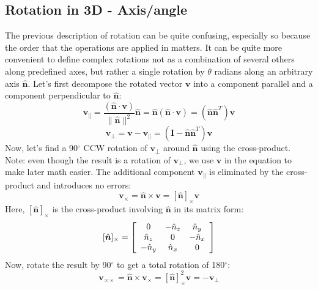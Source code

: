 \documentclass{article}
\begin{document}
\subsection{Rotation in 3D - Axis/angle}
The previous description of rotation can be quite confusing, especially so because the order that the operations are applied in matters. It can be quite more convenient to define complex rotations not as a combination of several others along predefined axes, but rather a single rotation by $\theta$ radians along an arbitrary axis $\mathbf{\hat n}$. Let's first decompose the rotated vector $\mathbf v$ into a component parallel and a component perpendicular to $\mathbf{\hat n}$:
\[
\boldsymbol { v } _ { \| } = 
\dfrac{( \hat { \boldsymbol { n } } \cdot \boldsymbol { v } )}{\| \hat { \boldsymbol { n } } \| ^ 2} \hat { \boldsymbol { n } } = 
\hat { \boldsymbol { n } } ( \hat { \boldsymbol { n } } \cdot \boldsymbol { v } ) = 
\left( \hat { \boldsymbol { n } } \hat { \boldsymbol { n } } ^ { T } \right) \boldsymbol { v }
\]
\[
\boldsymbol { v } _ { \perp } =
\boldsymbol { v } - \boldsymbol { v } _ { \| } =
\left( \boldsymbol { I } - \hat { \boldsymbol { n } } \hat { \boldsymbol { n } } ^ { T } \right) \boldsymbol { v }
\]
\noindent
Now, let's find a 90$^\circ$ CCW rotation of $\mathbf{v_\perp}$ around $\mathbf{\hat n}$ using the cross-product. Note: even though the result is a rotation of $\mathbf{v_\perp}$, we use $\mathbf v$ in the equation to make later math easier. The additional component $\mathbf{v_\|}$ is eliminated by the cross-product and introduces no errors: 
\[
\boldsymbol { v } _ { \times } = \hat { \boldsymbol { n } } \times \boldsymbol { v } = [ \hat { \boldsymbol { n } } ]_{\times} \boldsymbol { v }
\]
\noindent
Here, $[ \hat { \boldsymbol { n } } ]_{\times}$ is the cross-product involving $\hat { \boldsymbol { n } }$ in its matrix form:
\[
[ \hat { \boldsymbol { n } } ] _ { \times } = \left[ \begin{array} { c c c } { 0 } & { - \hat { n } _ { z } } & { \hat { n } _ { y } } \\ { \hat { n } _ { z } } & { 0 } & { - \hat { n } _ { x } } \\ { - \hat { n } _ { y } } & { \hat { n } _ { x } } & { 0 } \end{array} \right]
\]
\noindent
Now, rotate the result by 90$^\circ$ to get a total rotation of 180$^\circ$:
\[
\boldsymbol { v } _ { \times \times } = \hat { \boldsymbol { n } } \times \boldsymbol { v } _ { \times } = [ \hat { \boldsymbol { n } } ] _ { \times } ^ { 2 } \boldsymbol { v } = 
- \boldsymbol { v } _ { \perp }
\]
\end{document}
